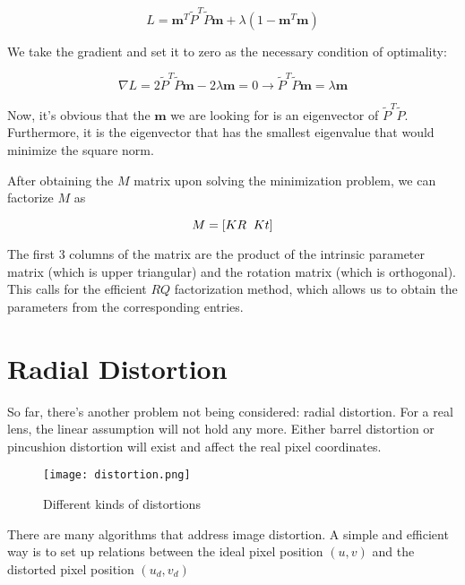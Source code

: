 \documentclass[]{article}
\begin{document}
\begin{equation}
    L = \mathbf{m}^T\tilde{P}^T\tilde{P}\mathbf{m} + \lambda(1 - \mathbf{m}^T \mathbf{m})
\end{equation}

We take the gradient and set it to zero as the necessary condition of optimality:

\begin{equation}
    \nabla L = 2\tilde{P}^T \tilde{P} \mathbf{m} - 2\lambda \mathbf{m} = 0  \xrightarrow{} \tilde{P}^T \tilde{P} \mathbf{m} = \lambda \mathbf{m}
\end{equation}

Now, it's obvious that the $\mathbf{m}$ we are looking for is an eigenvector of $\tilde{P}^T \tilde{P}$. Furthermore, it is the eigenvector that has the smallest eigenvalue that would minimize the square norm.

After obtaining the $M$ matrix upon solving the minimization problem, we can factorize $M$ as

\begin{equation}
    M = [KR \hspace{2mm} Kt]
\end{equation}

The first 3 columns of the matrix are the product of the intrinsic parameter matrix (which is upper triangular) and the rotation matrix (which is orthogonal). This calls for the efficient $RQ$ factorization method, which allows us to obtain the parameters from the corresponding entries.



\section{Radial Distortion}
So far, there's another problem not being considered: radial distortion. For a real lens, the linear assumption will not hold any more. Either barrel distortion or pincushion distortion will exist and affect the real pixel coordinates.

\begin{figure}[H]
\texttt{[image: distortion.png]}
\centering
\caption{Different kinds of distortions}
\label{fig:distortion}
\end{figure}

There are many algorithms that address image distortion. A simple and efficient way is to set up relations between the ideal pixel position $(u,v)$ and the distorted pixel position $(u_d,v_d)$
\end{document}

